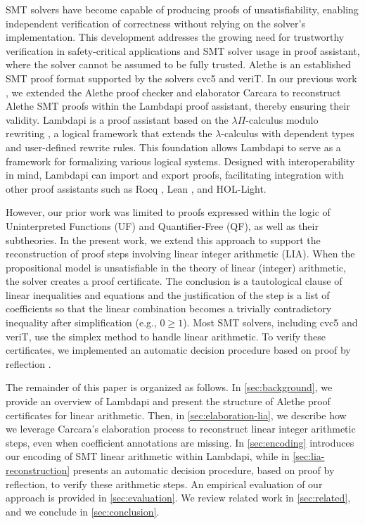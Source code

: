 \documentclass[runningheads]{llncs}
\begin{document}
SMT solvers have become capable of producing proofs of unsatisfiability,  enabling independent verification of correctness without relying on the solver's implementation.
This development addresses the growing need for trustworthy verification in safety-critical applications and SMT solver usage in proof assistant, where the solver cannot be assumed to be fully trusted.
Alethe \cite{alethe,alethespec} is an established SMT proof format supported by the solvers cvc5 and veriT. In our previous work \cite{ColtellacciMD24}, we extended the Alethe proof checker and elaborator Carcara \cite{carcara} to
reconstruct Alethe SMT proofs within the Lambdapi proof assistant, thereby ensuring their validity.
Lambdapi \cite{lambdapi} is a proof assistant based on the $\lambda\Pi$-calculus modulo rewriting \cite{lpmodulo}, a logical framework \cite{lf} that extends the $\lambda$-calculus with dependent types and user-defined rewrite rules.
This foundation allows Lambdapi to serve as a framework for formalizing various logical systems.
Designed with interoperability in mind, Lambdapi can import and export proofs, facilitating integration with other proof assistants \cite{LPAR2024:Translating_HOL_Light_proofs} such as Rocq \cite{Rocq-refman}, Lean \cite{lean4:2021}, and HOL-Light. 

However, our prior work was limited to proofs expressed within the logic of Uninterpreted Functions (UF) and Quantifier-Free (QF), as well as their subtheories. 
In the present work, we extend this approach to support the reconstruction of proof steps involving linear integer arithmetic (LIA).
When the propositional model is unsatisfiable in the theory of linear (integer) arithmetic, the solver creates a proof certificate.
The conclusion is a tautological clause of linear inequalities and equations and the justification of the step is a list of coefficients so that the linear combination becomes a trivially contradictory inequality after simplification (e.g., $0 \geq 1$).
Most SMT solvers, including cvc5 and veriT, use the simplex method \cite{SRI:simplex:dpllt} to handle linear arithmetic.
To verify these certificates, we implemented an automatic decision procedure based on proof by reflection \cite{reflection-origin-coq,ring-coq}.

The remainder of this paper is organized as follows.
In \cref{sec:background}, we provide an overview of Lambdapi and present the structure of Alethe proof certificates for linear arithmetic.
Then, in \cref{sec:elaboration-lia}, we describe how we leverage Carcara's elaboration process to reconstruct linear integer arithmetic steps, even when coefficient annotations are missing.
In \cref{sec:encoding} introduces our encoding of SMT linear arithmetic within Lambdapi, while in \cref{sec:lia-reconstruction} presents an automatic decision procedure, based on proof by reflection, to verify these arithmetic steps.
An empirical evaluation of our approach is provided in \cref{sec:evaluation}. We review related work in \cref{sec:related}, and we conclude in \cref{sec:conclusion}.
\end{document}
